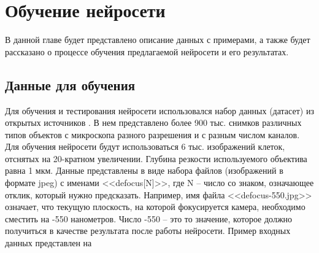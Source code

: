 
\chapter{Обучение нейросети} \label{ch3}


В данной главе будет представлено описание данных с примерами, а также будет рассказано о процессе обучения предлагаемой нейросети и его результатах.

\section{Данные для обучения} \label{ch3:sec1}
Для обучения и тестирования нейросети использовался набор данных (датасет) из открытых источников \cite{jiang2018transform}. В нем представлено более 900 тыс. снимков различных типов объектов с микроскопа разного разрешения и с разным числом каналов. Для обучения нейросети будут использоваться 6 тыс. изображений клеток, отснятых на 20-кратном увеличении. Глубина резкости используемого объектива равна 1 мкм. Данные представлены в виде набора файлов (изображений в формате jpeg) с именами <<defocus[N]>>, где N -- число со знаком, означающее отклик, который нужно предсказать. Например, имя файла <<defocus-550.jpg>> означает, что текущую плоскость, на которой фокусируется камера, необходимо сместить на -550 нанометров. Число -550 -- это то значение, которое должно получиться в качестве результата после работы нейросети. Пример входных данных представлен на 


